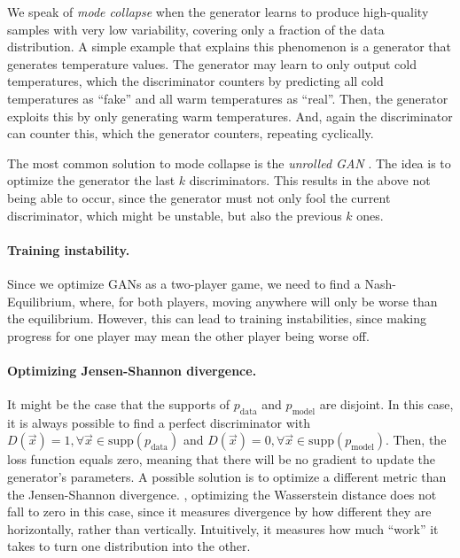 We speak of \textit{mode collapse} when the generator learns to produce high-quality samples with
very low variability, covering only a fraction of the data distribution. A simple example that
explains this phenomenon is a generator that generates temperature values. The generator may learn
to only output cold temperatures, which the discriminator counters by predicting all cold
temperatures as ``fake'' and all warm temperatures as ``real''. Then, the generator exploits this
by only generating warm temperatures. And, again the discriminator can counter this, which the
generator counters, repeating cyclically.

The most common solution to mode collapse is the \textit{unrolled GAN} \citep{metz2017unrolled}.
The idea is to optimize the generator \wrt the last $k$ discriminators. This results in the above
not being able to occur, since the generator must not only fool the current discriminator, which
might be unstable, but also the previous $k$ ones.

\paragraph{Training instability.}

Since we optimize GANs as a two-player game, we need to find a Nash-Equilibrium, where, for both
players, moving anywhere will only be worse than the equilibrium. However, this can lead to
training instabilities, since making progress for one player may mean the other player being worse
off.

\paragraph{Optimizing Jensen-Shannon divergence.}

It might be the case that the supports of $p_{\mathrm{data}}$ and $p_{\mathrm{model}}$ are
disjoint. In this case, it is always possible to find a perfect discriminator with $D(\vec{x}) = 1,
    \forall \vec{x} \in \mathrm{supp}(p_{\mathrm{data}})$ and $D(\vec{x}) = 0, \forall \vec{x} \in
    \mathrm{supp}(p_{\mathrm{model}})$. Then, the loss function equals zero, meaning that there will be
no gradient to update the generator's parameters. A possible solution is to optimize a different
metric than the Jensen-Shannon divergence. \Eg, optimizing the Wasserstein distance does not fall
to zero in this case, since it measures divergence by how different they are horizontally, rather
than vertically. Intuitively, it measures how much ``work'' it takes to turn one distribution into
the other.
